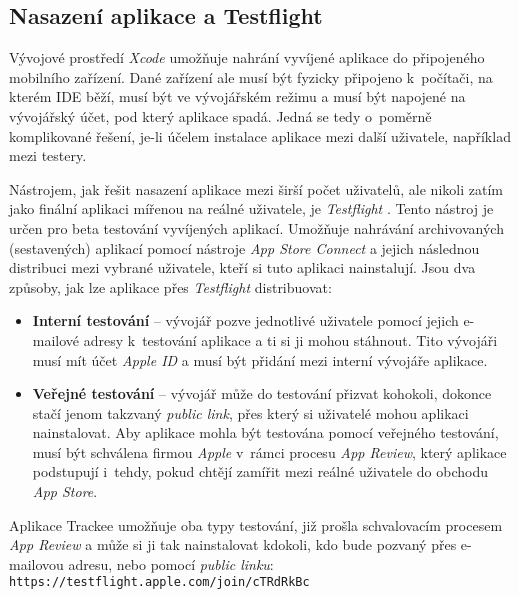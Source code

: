\subsection{Nasazení aplikace a Testflight}\label{testflight}

Vývojové prostředí \emph{Xcode} umožňuje nahrání vyvíjené aplikace do připojeného mobilního zařízení. Dané zařízení ale musí být fyzicky připojeno k~počítači, na kterém IDE běží, musí být ve vývojářském režimu a musí být napojené na vývojářský účet, pod který aplikace spadá. Jedná se tedy o~poměrně komplikované řešení, je-li účelem instalace aplikace mezi další uživatele, například mezi testery.

Nástrojem, jak řešit nasazení aplikace mezi širší počet uživatelů, ale nikoli zatím jako finální aplikaci mířenou na reálné uživatele, je \emph{Testflight} \cite{testflight}. Tento nástroj je určen pro beta testování vyvíjených aplikací. Umožňuje nahrávání archivovaných (sestavených) aplikací pomocí nástroje \emph{App Store Connect} \cite{app-store-connect} a jejich následnou distribuci mezi vybrané uživatele, kteří si tuto aplikaci nainstalují. Jsou dva způsoby, jak lze aplikace přes \emph{Testflight} distribuovat:
\begin{itemize}
\item\textbf{Interní testování} – vývojář pozve jednotlivé uživatele pomocí jejich e-mailové adresy k~testování aplikace a ti si ji mohou stáhnout. Tito vývojáři musí mít účet \emph{Apple ID} a musí být přidání mezi interní vývojáře aplikace.
\item\textbf{Veřejné testování} – vývojář může do testování přizvat kohokoli, dokonce stačí jenom takzvaný \emph{public link}, přes který si uživatelé mohou aplikaci nainstalovat. Aby aplikace mohla být testována pomocí veřejného testování, musí být schválena firmou \emph{Apple} v~rámci procesu \emph{App Review}, který aplikace podstupují i~tehdy, pokud chtějí zamířit mezi reálné uživatele do obchodu \emph{App Store}.
\end{itemize}

Aplikace Trackee umožňuje oba typy testování, již prošla schvalovacím procesem \emph{App Review} a může si ji tak nainstalovat kdokoli, kdo bude pozvaný přes e-mailovou adresu, nebo pomocí \emph{public linku}: \texttt{https://testflight.apple.com/join/cTRdRkBc}

